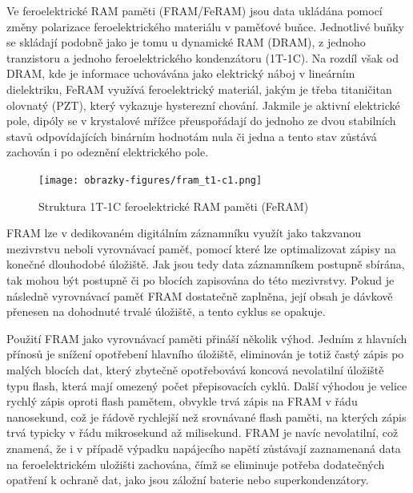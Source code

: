 Ve feroelektrické RAM paměti (FRAM/FeRAM) jsou data ukládána pomocí změny polarizace feroelektrického materiálu v paměťové buňce. Jednotlivé buňky se skládají podobně jako je tomu u dynamické RAM (DRAM), z jednoho tranzistoru a jednoho feroelektrického kondenzátoru (1T-1C). Na rozdíl však od DRAM, kde je informace uchovávána jako elektrický náboj v lineárním dielektriku, FeRAM využívá feroelektrický materiál, jakým je třeba titaničitan olovnatý (PZT), který vykazuje hysterezní chování. Jakmile je aktivní elektrické pole, dipóly se v krystalové mřížce přeuspořádají do jednoho ze dvou stabilních stavů odpovídajících binárním hodnotám nula či jedna a tento stav zůstává zachován i po odeznění elektrického pole. \cite{ieee_feram_ultra_high_density_embedded_mem}

\begin{figure}[h]
    \centering
    \texttt{[image: obrazky-figures/fram\_t1-c1.png]}
    
    \caption{Struktura 1T-1C feroelektrické RAM paměti (FeRAM) \cite{researchgate_nonvolatile_memory_technologies}}
    \label{fig:feram-1t-1c}
\end{figure}

FRAM lze v dedikovaném digitálním záznamníku využít jako takzvanou mezivrstvu neboli vyrovnávací paměť, pomocí které lze optimalizovat zápisy na konečné dlouhodobé úložiště. Jak jsou tedy data záznamníkem postupně sbírána, tak mohou být postupně či po blocích zapisována do této mezivrstvy. Pokud je následně vyrovnávací paměť FRAM dostatečně zaplněna, její obsah je dávkově přenesen na dohodnuté trvalé úložiště, a tento cyklus se opakuje. 


Použití FRAM jako vyrovnávací paměti přináší několik výhod. Jedním z hlavních přínosů je snížení opotřebení hlavního úložiště, eliminován je totiž častý zápis po malých blocích dat, který zbytečně opotřebovává koncová nevolatilní úložiště typu flash, která mají omezený počet přepisovacích cyklů. Další výhodou je velice rychlý zápis oproti flash pamětem, obvykle trvá zápis na FRAM v řádu nanosekund, což je řádově rychlejší než srovnávané flash paměti, na kterých zápis trvá typicky v řádu mikrosekund až milisekund. FRAM je navíc nevolatilní, což znamená, že i v případě výpadku napájecího napětí zůstávají zaznamenaná data na feroelektrickém uložišti zachována, čímž se eliminuje potřeba dodatečných opatření k ochraně dat, jako jsou záložní baterie nebo superkondenzátory.

